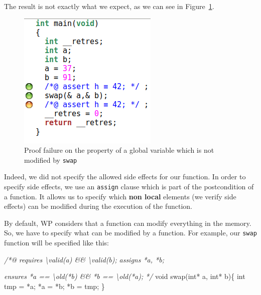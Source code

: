 \documentclass[12pt,francais,]{scrbook}
\newenvironment{Shaded}{}{}
\newcommand{\DataTypeTok}[1]{\textcolor[rgb]{0.56,0.13,0.00}{{#1}}}
\newcommand{\CommentTok}[1]{\textcolor[rgb]{0.38,0.63,0.69}{\textit{{#1}}}}
\newcommand{\NormalTok}[1]{{#1}}
\begin{document}
The result is not exactly what we expect, as we can see in
Figure~\ref{fig:2-2-2-swap-1}.

\begin{figure}[htbp]
\centering
\includegraphics[scale=0.5]{2-2-2-swap-1.png}
\caption{Proof failure on the property of a global variable which is not
  modified by \texttt{swap}}
\label{fig:2-2-2-swap-1}
\end{figure}

Indeed, we did not specify the allowed side effects for our function. In
order to specify side effects, we use an \texttt{assign} clause which is
part of the postcondition of a function. It allows us to specify which
\textbf{non local} elements (we verify side effects) can be modified
during the execution of the function.

By default, WP considers that a function can modify everything in the
memory. So, we have to specify what can be modified by a function. For
example, our \texttt{swap} function will be specified like this:

\begin{footnotesize}\begin{Shaded}
\begin{Highlighting}[]
\CommentTok{/*@}
\CommentTok{  requires \textbackslash{}valid(a) && \textbackslash{}valid(b);}
\CommentTok{ }
\CommentTok{  assigns *a, *b;}

\CommentTok{  ensures  *a == \textbackslash{}old(*b) && *b == \textbackslash{}old(*a);}
\CommentTok{*/}
\DataTypeTok{void} \NormalTok{swap(}\DataTypeTok{int}\NormalTok{* a, }\DataTypeTok{int}\NormalTok{* b)\{}
  \DataTypeTok{int} \NormalTok{tmp = *a;}
  \NormalTok{*a = *b;}
  \NormalTok{*b = tmp;}
\NormalTok{\}}
\end{Highlighting}
\end{Shaded}\end{footnotesize}
\end{document}
